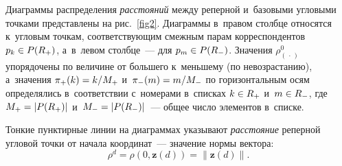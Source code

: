 \begin{multicols}{2}
\begin{figure*} %
\vspace*{1pt}
  \begin{center}  
    \mbox{%
\epsfxsize=153.085mm
}

\end{center}
\vspace*{-12pt}
\label{fig2}
\vspace*{3pt}
  \begin{center}  
    \mbox{%
\epsfxsize=152.768mm
}

\end{center}
\vspace*{-12pt}
\label{fig4}
\end{figure*}




Диаграммы распределения \textit{расстояний} меж\-ду реперной 
и~базовыми угловыми точ\-ка\-ми пред\-ставле\-ны на рис.~\ref{fig2}. 
Диа\-грам\-мы в~правом столбце\linebreak
относятся к~угловым точ\-кам, со\-от\-вет\-ст\-ву\-ющим смеж\-ным парам
корреспондентов $p_k\hm\in P(R_+)$, а~в~левом столбце~--- для $p_m\hm\in  P(R_-)$.
Значения $\rho^0_{(\,\cdot\,)}$ упорядочены по величине от
большего к~меньшему (по не\-воз\-рас\-та\-нию), а~значения
 $\pi_+(k)\hm={k}/{M_+}$ и~$\pi_-(m)\hm={m}/{M_-}$ по горизонтальным осям определялись 
 в~соответствии с~номерами в~спис\-ках $k\hm\in R_+$ и~$m\hm\in R_-$, 
 где $M_+\hm=\vert P(R_+)\vert $ и~$M_-\hm=\vert P(R_-)\vert$~--- общее чис\-ло элементов в~списке.

Тонкие пунктирные линии на диаграммах указывают
\textit{рас\-сто\-яние} реперной угловой точ\-ки от начала координат~---
значение нор\-мы вектора:
$$
\rho^d=\rho(0,\mathbf{z}(d))=\|\mathbf{z}(d)\|.
$$






\end{multicols}
